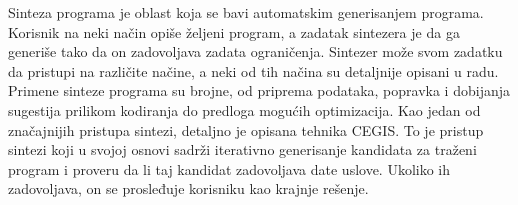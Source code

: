 \abstract

Sinteza programa je oblast koja se bavi automatskim generisanjem programa. Korisnik na neki način opiše željeni program, a zadatak sintezera je da ga generiše tako da on zadovoljava zadata ograničenja. Sintezer može svom zadatku da pristupi na različite načine, a neki od tih načina su detaljnije opisani u radu. Primene sinteze programa su brojne, od priprema podataka, popravka i dobijanja sugestija prilikom kodiranja do predloga mogućih optimizacija. Kao jedan od značajnijih pristupa sintezi, detaljno je opisana tehnika CEGIS. To je pristup sintezi koji u svojoj osnovi sadrži iterativno generisanje kandidata za traženi program i proveru da li taj kandidat zadovoljava date uslove. Ukoliko ih zadovoljava, on se prosleđuje korisniku kao krajnje rešenje.
